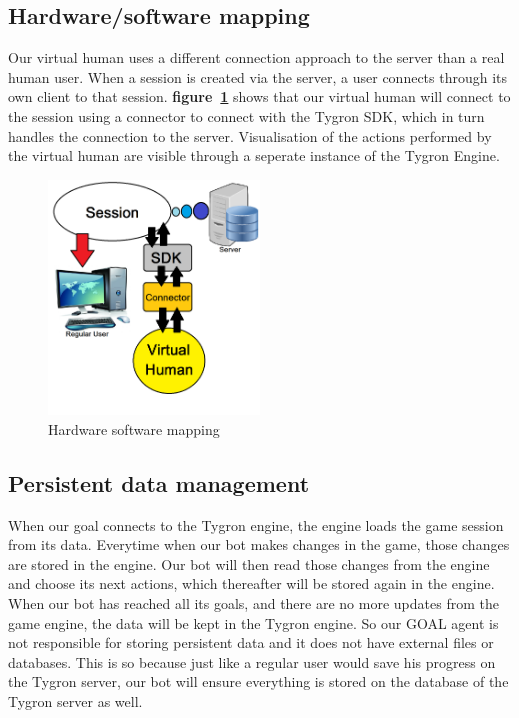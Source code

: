 \subsection{Hardware/software mapping}
Our virtual human uses a different connection approach to the server than a real human user. When a session is created via the server, a user connects through its own client to that session. \textbf{figure~\ref{fig:Hard_soft_map}} shows that our virtual human will connect to the session using a connector to connect with the Tygron SDK, which in turn handles the connection to the server. Visualisation of the actions performed by the virtual human are visible through a seperate instance of the Tygron Engine.

\begin{figure}
	\centering
	\includegraphics[width=0.5\textwidth]{Hardware_software_mapping}
	\caption{Hardware software mapping}
	\label{fig:Hard_soft_map}
\end{figure}

\subsection{Persistent data management}
When our goal connects to the Tygron engine, the engine loads the game session from its data. Everytime when our bot makes changes in the game, those changes are stored in the engine. Our bot will then read those changes from the engine and choose its next actions, which thereafter will be stored again in the engine. When our bot has reached all its goals, and there are no more updates from the game engine, the data will be kept in the Tygron engine. So our GOAL agent is not responsible for storing persistent data and it does not have external files or databases. This is so because just like a regular user would save his progress on the Tygron server, our bot will ensure everything is stored on the database of the Tygron server as well.


